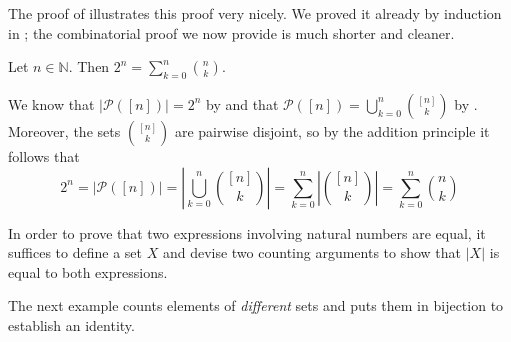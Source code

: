 The proof of  illustrates this proof very nicely. We proved it already by induction in ; the combinatorial proof we now provide is much shorter and cleaner.

\begin{proposition} \label{propSumOfBinomialsIsExp}
Let $n \in \mathbb{N}$. Then $2^n = \displaystyle\sum_{k=0}^n \binom{n}{k}$.
\end{proposition}
\begin{cproof}
We know that $|\mathcal{P}([n])| = 2^n$ by  and that $\mathcal{P}([n]) = \bigcup_{k=0}^n \binom{[n]}{k}$ by . Moreover, the sets $\binom{[n]}{k}$ are pairwise disjoint, so by the addition principle it follows that
\[ 2^n = |\mathcal{P}([n])| = \left|\bigcup_{k=0}^n \binom{[n]}{k}\right| = \sum_{k=0}^n \left| \binom{[n]}{k} \right| = \sum_{k=0}^n \binom{n}{k} \]
\end{cproof}

\begin{strategy}
In order to prove that two expressions involving natural numbers are equal, it suffices to define a set $X$ and devise two counting arguments to show that $|X|$ is equal to both expressions.
\end{strategy}

The next example counts elements of \textit{different} sets and puts them in bijection to establish an identity.

